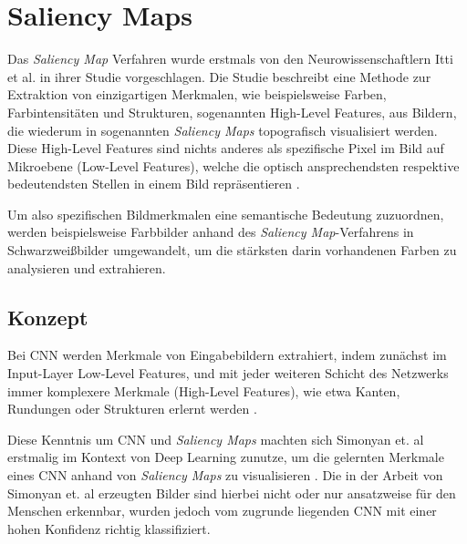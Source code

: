 \chapter{Saliency Maps}
\label{cha:saliency}
Das \textit{Saliency Map} Verfahren wurde erstmals von den Neurowissenschaftlern Itti et al. \cite{itti_model_1998} in ihrer Studie vorgeschlagen. 
Die Studie beschreibt eine Methode zur Extraktion von einzigartigen Merkmalen, wie beispielsweise Farben, Farbintensitäten und Strukturen, sogenannten High-Level Features, aus Bildern, die wiederum in sogenannten \textit{Saliency Maps} topografisch visualisiert werden. 
Diese High-Level Features sind nichts anderes als spezifische Pixel im Bild auf Mikroebene (Low-Level Features), welche die optisch ansprechendsten respektive bedeutendsten Stellen in einem Bild repräsentieren \cite{itti_model_1998}. 

Um also spezifischen Bildmerkmalen eine semantische Bedeutung zuzuordnen, werden beispielsweise Farbbilder anhand des \textit{Saliency Map}-Verfahrens in Schwarzweißbilder umgewandelt, um die stärksten darin vorhandenen Farben zu analysieren und extrahieren.

\section{Konzept}
\label{cha:saliency_konz}
Bei \ac{CNN} werden Merkmale von Eingabebildern extrahiert, indem zunächst im Input-Layer Low-Level Features, und mit jeder weiteren Schicht des Netzwerks immer komplexere Merkmale (High-Level Features), wie etwa Kanten, Rundungen oder Strukturen erlernt werden \cite{stanford_unsupervised_tutorial}.

Diese Kenntnis um \ac{CNN} und \textit{Saliency Maps} machten sich Simonyan et. al erstmalig im Kontext von Deep Learning zunutze, um die gelernten Merkmale eines \ac{CNN} anhand von \textit{Saliency Maps} zu visualisieren \cite{simonyan_deep_2013}. 
Die in der Arbeit von Simonyan et. al erzeugten Bilder sind hierbei nicht oder nur ansatzweise für den Menschen erkennbar, wurden jedoch vom zugrunde liegenden \ac{CNN} mit einer hohen Konfidenz richtig klassifiziert.
~\newline

